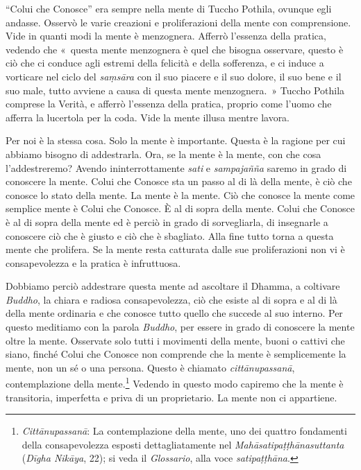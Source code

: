 ``Colui che Conosce'' era sempre nella mente di Tuccho Pothila, ovunque
egli andasse. Osservò le varie creazioni e proliferazioni della mente
con comprensione. Vide in quanti modi la mente è menzognera. Afferrò
l'essenza della pratica, vedendo che «~questa mente menzognera è quel
che bisogna osservare, questo è ciò che ci conduce agli estremi della
felicità e della sofferenza, e ci induce a vorticare nel ciclo del
\emph{saṃsāra} con il suo piacere e il suo dolore, il suo bene e il suo
male, tutto avviene a causa di questa mente menzognera.~» Tuccho Pothila
comprese la Verità, e afferrò l'essenza della pratica, proprio come
l'uomo che afferra la lucertola per la coda. Vide la mente illusa mentre
lavora.

Per noi è la stessa cosa. Solo la mente è importante. Questa è la
ragione per cui abbiamo bisogno di addestrarla. Ora, se la mente è la
mente, con che cosa l'addestreremo? Avendo ininterrottamente \emph{sati}
e \emph{sampajañña} saremo in grado di conoscere la mente. Colui che
Conosce sta un passo al di là della mente, è ciò che conosce lo stato
della mente. La mente è la mente. Ciò che conosce la mente come semplice
mente è Colui che Conosce. È al di sopra della mente. Colui che Conosce
è al di sopra della mente ed è perciò in grado di sorvegliarla, di
insegnarle a conoscere ciò che è giusto e ciò che è sbagliato. Alla fine
tutto torna a questa mente che prolifera. Se la mente resta catturata
dalle sue proliferazioni non vi è consapevolezza e la pratica è
infruttuosa.

Dobbiamo perciò addestrare questa mente ad ascoltare il Dhamma, a
coltivare \emph{Buddho}, la chiara e radiosa consapevolezza, ciò che
esiste al di sopra e al di là della mente ordinaria e che conosce tutto
quello che succede al suo interno. Per questo meditiamo con la parola
\emph{Buddho}, per essere in grado di conoscere la mente oltre la mente.
Osservate solo tutti i movimenti della mente, buoni o cattivi che siano,
finché Colui che Conosce non comprende che la mente è semplicemente la
mente, non un sé o una persona. Questo è chiamato \emph{cittānupassanā},
contemplazione della mente.\footnote{\emph{Cittānupassanā}: La
  contemplazione della mente, uno dei quattro fondamenti della
  consapevolezza esposti dettagliatamente nel
  \emph{Mahāsatipaṭṭhānasuttanta} (\emph{Dīgha Nikāya}, 22); si veda il
  \emph{Glossario}, alla voce \emph{satipaṭṭhāna}.} Vedendo in questo
modo capiremo che la mente è transitoria, imperfetta e priva di un
proprietario. La mente non ci appartiene.

